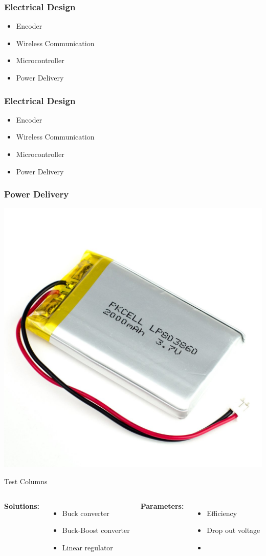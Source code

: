\documentclass[mathserif]{beamer}
\begin{document}
\begin{frame}[c]\frametitle{Electrical Design}
	\begin{itemize}
    	\item Encoder
    	\item Wireless Communication
    	\item Microcontroller
    	\item Power Delivery
    \end{itemize}    
\end{frame}

\begin{frame}[c]\frametitle{Electrical Design}
	\begin{itemize}
    	\item Encoder
    	\item Wireless Communication
    	\item Microcontroller
    	\item \alert{Power Delivery}
    \end{itemize}    
\end{frame}

\begin{frame}[c]\frametitle{Power Delivery}
	\centering
	\vfill
    \includegraphics[width=.35\linewidth]{graphics/lipo}\\
    \vfill
    \vfill
\end{frame}



\begin{frame}[c]{Test Columns}
\begin{columns}
\textbf{Solutions:}   
\begin{itemize}
			\item Buck converter
			\item Buck-Boost converter
			\item Linear regulator
\end{itemize}
\textbf{Parameters:}
\begin{itemize}
			\item Efficiency
			\item Drop out voltage
			\item []
\end{itemize}
\end{columns}
\end{frame}
\end{document}
